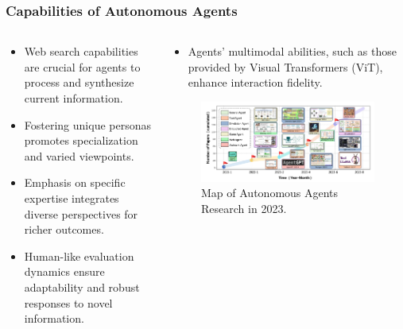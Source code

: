\documentclass{beamer}
\begin{document}
\begin{frame}
    \frametitle{Capabilities of Autonomous Agents}
    \begin{columns}[T] %
        \begin{column}{.48\textwidth}
            \begin{itemize}
                \item Web search capabilities are crucial for agents to process and synthesize current information.
                \item Fostering unique personas promotes specialization and varied viewpoints.
                \item Emphasis on specific expertise integrates diverse perspectives for richer outcomes.
                \item Human-like evaluation dynamics ensure adaptability and robust responses to novel information.
            \end{itemize}
        \end{column}
        \begin{column}{.48\textwidth}
            \begin{itemize}
                \item Agents’ multimodal abilities, such as those provided by Visual Transformers (ViT), enhance interaction fidelity.
            \end{itemize}
            \begin{figure}    
                \centering
                \includegraphics[width=\textwidth]{autonomous_agents.png}
                \caption{Map of Autonomous Agents Research in 2023.}
            \end{figure}
        \end{column}
    \end{columns}
    \end{frame}
    
\end{document}
